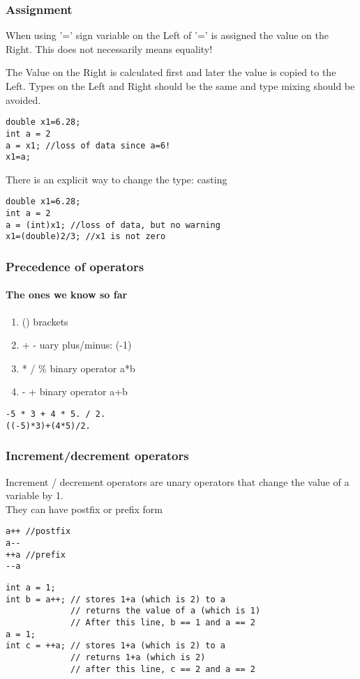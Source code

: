 \documentclass[10pt]{beamer}
\begin{document}
\begin{frame}[fragile]
  \frametitle{Assignment}
  \centering
  When using '=' sign variable on the Left of '=' is assigned the value on the Right. This does not necessarily means equality!
  
  The Value on the Right is calculated first and later the value is copied to the Left. Types on the Left and Right should be the same
  and type mixing should be avoided.
  
\begin{lstlisting}
double x1=6.28;
int a = 2
a = x1; //loss of data since a=6!
x1=a;
\end{lstlisting}
There is an explicit way to change the type: casting
\begin{lstlisting}
double x1=6.28;
int a = 2
a = (int)x1; //loss of data, but no warning
x1=(double)2/3; //x1 is not zero
\end{lstlisting}

\end{frame}

\begin{frame}[fragile]
  \frametitle{Precedence of operators}
  \framesubtitle{The ones we know so far}
  \centering
  \begin{enumerate}
    \item () brackets
    \item + - uary plus/minus: (-1)
    \item * / \% binary operator a*b
    \item - + binary operator a+b
  \end{enumerate}

\begin{lstlisting}
-5 * 3 + 4 * 5. / 2. 
((-5)*3)+(4*5)/2.
\end{lstlisting}

\end{frame}

\begin{frame}[fragile]
  \frametitle{Increment/decrement operators}
  Increment / decrement operators are unary operators that change the value of a variable by 1.\\
  They can have postfix or prefix form

\begin{lstlisting}
a++ //postfix
a--
++a //prefix
--a
\end{lstlisting}

\begin{lstlisting}
int a = 1;
int b = a++; // stores 1+a (which is 2) to a
             // returns the value of a (which is 1)
             // After this line, b == 1 and a == 2
a = 1;
int c = ++a; // stores 1+a (which is 2) to a
             // returns 1+a (which is 2)
             // after this line, c == 2 and a == 2
\end{lstlisting}

\end{frame}
\end{document}
